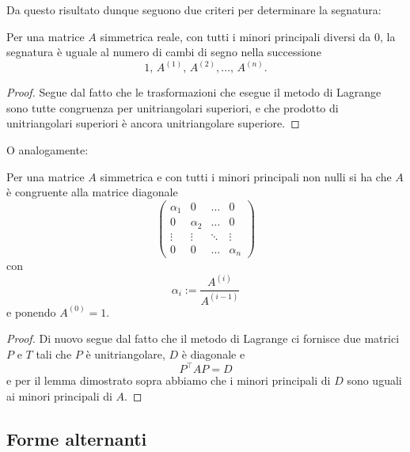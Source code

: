 \documentclass[11pt]{scrartcl}
\begin{document}
	Da questo risultato dunque seguono due criteri per determinare la segnatura:
	\begin{corollary}
		Per una matrice $A$ simmetrica reale, con tutti i minori principali diversi da $0$, la segnatura è uguale al numero di cambi di segno nella successione
		$$1,\,A^{(1)},\,A^{(2)},\dots,\,A^{(n)}.$$ 
	\end{corollary}
	\begin{proof}
		Segue dal fatto che le trasformazioni che esegue il metodo di Lagrange sono tutte congruenza per unitriangolari superiori, e che prodotto di unitriangolari superiori è ancora unitriangolare superiore.
	\end{proof}
	O analogamente:
	\begin{corollary}
		Per una matrice $A$ simmetrica e con tutti i minori principali non nulli si ha che $A$ è congruente alla matrice diagonale 
		$$
		\begin{pmatrix}
			\alpha_1 & 0 & \dots & 0 \\
			0 & \alpha_2 & \dots & 0 \\
			\vdots & \vdots & \ddots & \vdots \\
			0 & 0 & \dots & \alpha_n
		\end{pmatrix}
		$$
		con 
		$$\alpha_i:=\frac{A^{(i)}}{A^{(i-1)}}$$
		e ponendo $A^{(0)}=1$.
	\end{corollary}
	\begin{proof}
		Di nuovo segue dal fatto che il metodo di Lagrange ci fornisce due matrici $P$ e $T$ tali che $P$ è unitriangolare, $D$ è diagonale e 
		$$P^\intercal A P = D$$
		e per il lemma dimostrato sopra abbiamo che i minori principali di $D$ sono uguali ai minori principali di $A$.
	\end{proof}
	
	\subsection{Forme alternanti}
	
\end{document}
